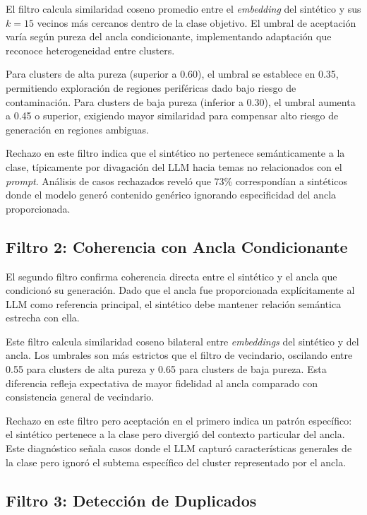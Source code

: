 El filtro calcula similaridad coseno promedio entre el \textit{embedding} del sintético y sus $k=15$ vecinos más cercanos dentro de la clase objetivo. El umbral de aceptación varía según pureza del ancla condicionante, implementando adaptación que reconoce heterogeneidad entre clusters.

Para clusters de alta pureza (superior a 0.60), el umbral se establece en 0.35, permitiendo exploración de regiones periféricas dado bajo riesgo de contaminación. Para clusters de baja pureza (inferior a 0.30), el umbral aumenta a 0.45 o superior, exigiendo mayor similaridad para compensar alto riesgo de generación en regiones ambiguas.

Rechazo en este filtro indica que el sintético no pertenece semánticamente a la clase, típicamente por divagación del LLM hacia temas no relacionados con el \textit{prompt}. Análisis de casos rechazados reveló que 73\% correspondían a sintéticos donde el modelo generó contenido genérico ignorando especificidad del ancla proporcionada.

\subsection{Filtro 2: Coherencia con Ancla Condicionante}
\label{subsec:filtro_ancla}

El segundo filtro confirma coherencia directa entre el sintético y el ancla que condicionó su generación. Dado que el ancla fue proporcionada explícitamente al LLM como referencia principal, el sintético debe mantener relación semántica estrecha con ella.

Este filtro calcula similaridad coseno bilateral entre \textit{embeddings} del sintético y del ancla. Los umbrales son más estrictos que el filtro de vecindario, oscilando entre 0.55 para clusters de alta pureza y 0.65 para clusters de baja pureza. Esta diferencia refleja expectativa de mayor fidelidad al ancla comparado con consistencia general de vecindario.

Rechazo en este filtro pero aceptación en el primero indica un patrón específico: el sintético pertenece a la clase pero divergió del contexto particular del ancla. Este diagnóstico señala casos donde el LLM capturó características generales de la clase pero ignoró el subtema específico del cluster representado por el ancla.

\subsection{Filtro 3: Detección de Duplicados}
\label{subsec:filtro_duplicados}

